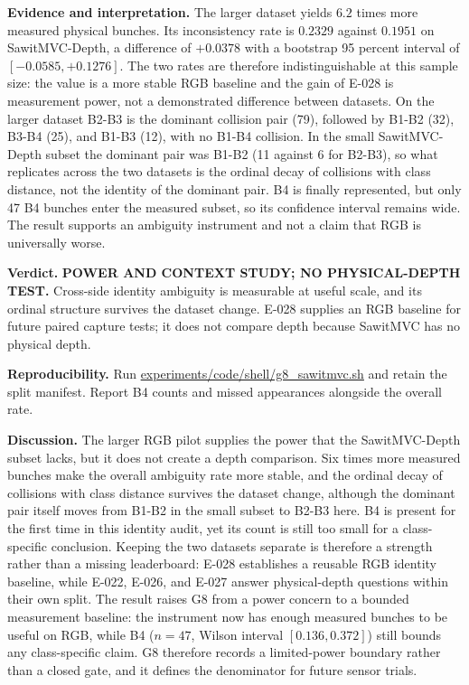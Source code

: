 \documentclass[preprint,12pt]{elsarticle}
\newcommand{\pathcode}[1]{\scriptsize\url{#1}}
\begin{document}
\textbf{Evidence and interpretation.} The larger dataset yields \(6.2\)
times more measured physical bunches. Its inconsistency rate is \(0.2329\)
against \(0.1951\) on SawitMVC-Depth, a difference of \(+0.0378\) with a
bootstrap 95 percent interval of \([-0.0585,+0.1276]\). The two rates are
therefore indistinguishable at this sample size: the value is a more stable
RGB baseline and the gain of E-028 is measurement power, not a demonstrated
difference between datasets. On the larger dataset B2-B3 is the dominant
collision pair (79), followed by B1-B2 (32), B3-B4 (25), and B1-B3 (12), with
no B1-B4 collision. In the small SawitMVC-Depth subset the dominant pair was
B1-B2 (11 against 6 for B2-B3), so what replicates across the two datasets is
the ordinal decay of collisions with class distance, not the identity of the
dominant pair. B4 is finally
represented, but only 47 B4 bunches enter the measured subset, so its
confidence interval remains wide. The result supports an ambiguity instrument
and not a claim that RGB is universally worse.

\textbf{Verdict.} \textbf{POWER AND CONTEXT STUDY; NO PHYSICAL-DEPTH TEST.}
Cross-side identity ambiguity is measurable at useful scale, and its ordinal
structure survives the dataset change. E-028 supplies an RGB baseline for
future paired capture tests; it does not compare depth because SawitMVC has no
physical depth.

\textbf{Reproducibility.} Run \pathcode{experiments/code/shell/g8_sawitmvc.sh} and retain the
split manifest. Report B4 counts and missed appearances alongside the overall
rate.

\textbf{Discussion.} The larger RGB pilot supplies the power that the
SawitMVC-Depth subset lacks, but it does not create a depth comparison. Six
times more measured bunches make the overall ambiguity rate more stable, and
the ordinal decay of collisions with class distance survives the dataset
change, although the dominant pair itself moves from B1-B2 in the small subset
to B2-B3 here. B4 is present for the
first time in this identity audit, yet its count is still too small for a
class-specific conclusion. Keeping the two datasets separate is therefore a
strength rather than a missing leaderboard: E-028 establishes a reusable RGB
identity baseline, while E-022, E-026, and E-027 answer physical-depth
questions within their own split. The result raises G8 from a power concern to
a bounded measurement baseline: the instrument now has enough measured bunches
to be useful on RGB, while B4 (\(n=47\), Wilson interval \([0.136, 0.372]\))
still bounds any class-specific claim. G8 therefore records a limited-power
boundary rather than a closed gate, and it defines the denominator for future
sensor trials.
\end{document}
